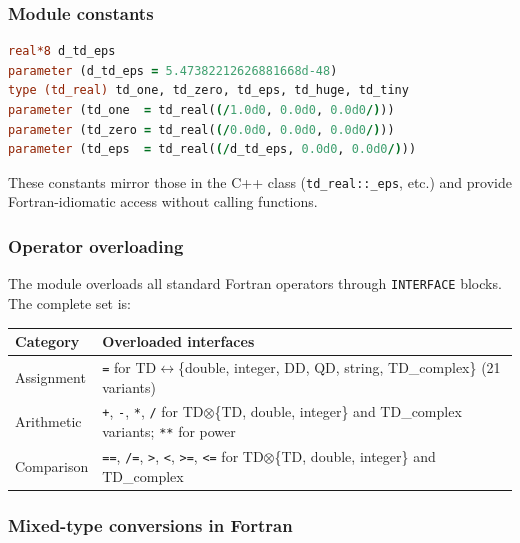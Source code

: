 \documentclass[11pt,a4paper]{article}
\begin{document}
\subsubsection{Module constants}

\begin{lstlisting}[language=Fortran]
real*8 d_td_eps
parameter (d_td_eps = 5.47382212626881668d-48)
type (td_real) td_one, td_zero, td_eps, td_huge, td_tiny
parameter (td_one  = td_real((/1.0d0, 0.0d0, 0.0d0/)))
parameter (td_zero = td_real((/0.0d0, 0.0d0, 0.0d0/)))
parameter (td_eps  = td_real((/d_td_eps, 0.0d0, 0.0d0/)))
\end{lstlisting}
These constants mirror those in the C++ class
(\texttt{td\_real::\_eps}, etc.) and provide Fortran-idiomatic
access without calling functions.

\subsubsection{Operator overloading}

The module overloads all standard Fortran operators through
\texttt{INTERFACE} blocks.  The complete set is:

\begin{center}
\begin{tabular}{lp{7.5cm}}
\toprule
Category & Overloaded interfaces \\
\midrule
Assignment & \texttt{=} for TD$\leftrightarrow$\{double, integer,
  DD, QD, string, TD\_complex\} (21 variants) \\
Arithmetic & \texttt{+}, \texttt{-}, \texttt{*}, \texttt{/} for
  TD$\otimes$\{TD, double, integer\} and TD\_complex variants;
  \texttt{**} for power \\
Comparison & \texttt{==}, \texttt{/=}, \texttt{>}, \texttt{<},
  \texttt{>=}, \texttt{<=} for TD$\otimes$\{TD, double, integer\}
  and TD\_complex \\
\bottomrule
\end{tabular}
\end{center}

\subsubsection{Mixed-type conversions in Fortran}
\end{document}
